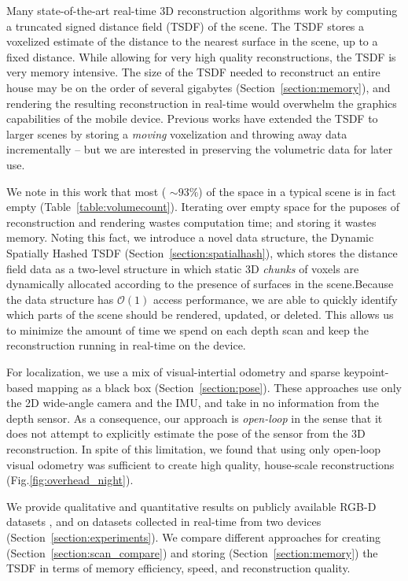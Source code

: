 \documentclass[10pt,twocolumn,letterpaper]{article}
\newcommand{\sref}[1]{Section~\ref{#1}}
\newcommand{\figref}[1]{Fig.\ref{#1}}
\newcommand{\tabref}[1]{Table~\ref{#1}}
\begin{document}
Many state-of-the-art real-time 3D reconstruction algorithms \cite{Newcombe,
Whelan2013, WhelanLoopClose, Bylow2013} work by computing a truncated signed
distance field (TSDF) \cite{Curless1996} of the scene. The TSDF stores a
voxelized estimate of the distance to the nearest surface in the scene, up to a
fixed distance. While allowing for very high quality reconstructions, the TSDF
is very memory intensive. The size of the TSDF needed to reconstruct an entire
house may be on the order of several gigabytes  (\sref{section:memory}), and
rendering the resulting reconstruction in real-time would overwhelm the graphics
capabilities of the mobile device. Previous works \cite{Whelan2013,
WhelanLoopClose} have extended the TSDF to larger scenes by storing a
\textit{moving} voxelization and throwing away data incrementally -- but we are
interested in preserving the volumetric data for later use.

We note in this work that most ( $\sim 93\%$) of the space in a typical scene
is in fact empty (\tabref{table:volumecount}). Iterating over empty space
for the puposes of reconstruction and rendering wastes computation time; and storing it
wastes memory. Noting this fact, we introduce a novel data structure, the
Dynamic Spatially Hashed \cite{SpatialHashing} TSDF (\sref{section:spatialhash}),
which stores the distance field data as a two-level structure in which static
3D \textit{chunks} of voxels are dynamically allocated according to the
presence of surfaces in the scene.Because the data structure has
$\mathcal{O}(1)$ access performance, we are able to quickly identify which
parts of the scene should be rendered, updated, or deleted. This allows us to
minimize the amount of time we spend on each depth scan and keep the
reconstruction running in real-time on the device.

For localization, we use a mix of  visual-intertial odometry \cite{VINS} and
sparse keypoint-based mapping \cite{FastSlam} as a black box
(\sref{section:pose}). These approaches use only the 2D wide-angle camera and
the IMU, and take in no information from the depth sensor. As a consequence,
our approach is \textit{open-loop} in the sense that it does not attempt to
explicitly estimate the pose of the sensor from the 3D reconstruction. In spite
of this limitation, we found that using only open-loop visual odometry was
sufficient to create high quality, house-scale reconstructions
(\figref{fig:overhead_night}).

 We provide qualitative and  quantitative results on publicly available RGB-D
 datasets \cite{FREIBURG}, and on datasets collected in real-time from two
 devices (\sref{section:experiments}). We compare different approaches for
 creating (\sref{section:scan_compare}) and storing (\sref{section:memory}) the
 TSDF in terms of memory efficiency, speed, and reconstruction quality.
\end{document}
